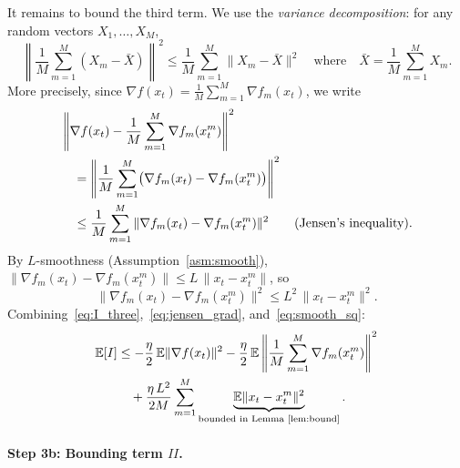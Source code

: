 \documentclass{article}
\begin{document}
It remains to bound the third term. We use the \emph{variance decomposition}:
for any random vectors $X_1, \ldots, X_M$,
\begin{equation}
\left\|\frac{1}{M}\sum_{m=1}^{M}(X_m - \bar{X})\right\|^2
\leq \frac{1}{M}\sum_{m=1}^{M}\|X_m - \bar{X}\|^2
\quad\text{where}\quad
\bar{X} = \frac{1}{M}\sum_{m=1}^{M}X_m.
\label{eq:var_decomp}
\end{equation}
More precisely, since $\nabla f(x_t) = \frac{1}{M}\sum_{m=1}^{M}\nabla f_m(x_t)$, we write
\begin{align}
&\left\|\nabla f(x_t) - \frac{1}{M}\sum_{m=1}^{M}
  \nabla f_m(x_t^m)\right\|^2 \notag \\
&\quad= \left\|\frac{1}{M}\sum_{m=1}^{M}\bigl(
  \nabla f_m(x_t) - \nabla f_m(x_t^m)\bigr)\right\|^2 \notag \\
&\quad\leq \frac{1}{M}\sum_{m=1}^{M}
  \|\nabla f_m(x_t) - \nabla f_m(x_t^m)\|^2
\qquad\text{(Jensen's inequality)}.
\label{eq:jensen_grad}
\end{align}
By $L$-smoothness (Assumption~\ref{asm:smooth}),
$\|\nabla f_m(x_t) - \nabla f_m(x_t^m)\| \leq L\,\|x_t - x_t^m\|$, so
\begin{equation}
\|\nabla f_m(x_t) - \nabla f_m(x_t^m)\|^2
\leq L^2\,\|x_t - x_t^m\|^2.
\label{eq:smooth_sq}
\end{equation}
Combining~\eqref{eq:I_three},~\eqref{eq:jensen_grad},
and~\eqref{eq:smooth_sq}:
\begin{align}
\mathbb{E}[I]
&\leq -\frac{\eta}{2}\,\mathbb{E}\|\nabla f(x_t)\|^2
  - \frac{\eta}{2}\,\mathbb{E}\left\|\frac{1}{M}\sum_{m=1}^{M}
    \nabla f_m(x_t^m)\right\|^2 \notag \\
&\quad+ \frac{\eta\,L^2}{2M}\sum_{m=1}^{M}
  \underbrace{\mathbb{E}\|x_t - x_t^m\|^2}_{\text{bounded in Lemma~\ref{lem:bound}}}.
\label{eq:I_final}
\end{align}

\paragraph{Step 3b: Bounding term $II$.}
\end{document}
